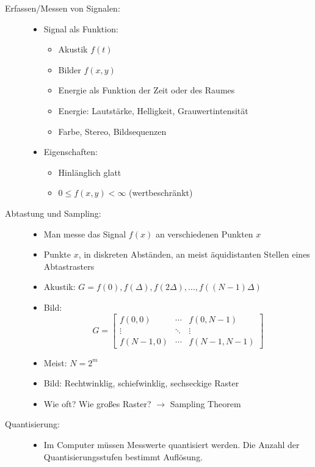 \begin{description}
\item[Erfassen/Messen von Signalen:] \quad
\begin{itemize}
\item Signal als Funktion: 
\begin{itemize}
	\item Akustik $f(t)$
	\item Bilder $f(x,y)$
	\item Energie als Funktion der Zeit oder des Raumes
	\item Energie: Lautstärke, Helligkeit, Grauwertintensität
	\item Farbe, Stereo, Bildsequenzen
\end{itemize}
\item Eigenschaften: 
\begin{itemize}
	\item Hinlänglich glatt
	\item $0 \leq f(x,y) < \infty$ (wertbeschränkt)
\end{itemize} 
\end{itemize}
\item[Abtastung und Sampling:] \quad
\begin{itemize}
\item Man messe das Signal $f(x)$ an verschiedenen Punkten $x$
\item Punkte $x$, in diskreten Abständen, an meist äquidistanten Stellen eines Abtastrasters
\item Akustik: $G = f(0), f(\Delta), f(2 \Delta), \dots, f((N-1)\Delta)$
\item Bild: $$G = \left[ \begin{array}{ccc} f(0,0) & \cdots & f(0,N-1) \\ \vdots & \ddots & \vdots \\ f(N-1,0) & \cdots & f(N-1,N-1) \end{array} \right]$$
\item Meist: $N = 2^m$
\item Bild: Rechtwinklig, schiefwinklig, sechseckige Raster
\item Wie oft? Wie großes Raster? $\to$ Sampling Theorem
\end{itemize}
\item[Quantisierung:] \quad
\begin{itemize}
\item Im Computer müssen Messwerte quantisiert werden. Die Anzahl der Quantisierungsstufen bestimmt Auflösung.

\end{itemize}
\end{description}
